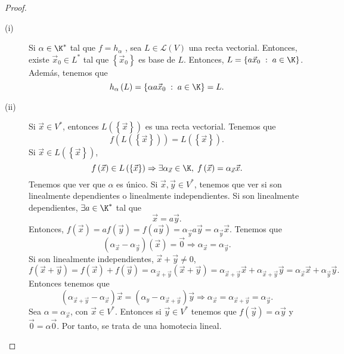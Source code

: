 \begin{proof}
\begin{description}
	\item[(i)] Si $\displaystyle \alpha \in \K^{*} $ tal que $\displaystyle f = h_{\alpha} $ , sea $\displaystyle L \in \mathcal{L}\left(V\right) $ una recta vectorial. Entonces, existe $\displaystyle \vec{x}_{0} \in L^{*}$ tal que $\displaystyle \left\{ \vec{x}_{0}\right\}  $ es base de $\displaystyle L $. Entonces, $\displaystyle L = \left\{ a\vec{x}_{0} \; : \; a \in \K\right\}  $. Además, tenemos que 
		\[h_{\alpha }\left(L\right) = \left\{ \alpha a \vec{x}_{0}\; : \; a \in \K \right\} = L .\]
	\item[(ii)] Si $\displaystyle  \vec{x} \in V^{*} $, entonces $\displaystyle L\left( \left\{ \vec{x}\right\} \right)  $ es una recta vectorial. Tenemos que
		\[f\left(L\left( \left\{ \vec{x}\right\} \right)\right) = L\left( \left\{ \vec{x}\right\} \right) .\]
		Si $\displaystyle \vec{x} \in L\left( \left\{ \vec{x}\right\} \right) $, 
		\[f\left(\vec{x}\right) \in L\left( \left\{ \vec{x}\right\} \right) \Rightarrow \exists \alpha_{\vec{x}} \in \K, \; f\left(\vec{x}\right) = \alpha_{\vec{x}}\vec{x} .\]
Tenemos que ver que $\displaystyle \alpha  $ es único. Si $\displaystyle \vec{x}, \vec{y} \in V^{*} $, tenemos que ver si son linealmente dependientes o linealmente independientes. Si son linealmente dependientes, $\displaystyle \exists a \in \K^{*} $ tal que 
\[\vec{x} = a \vec{y} .\]
Entonces, $\displaystyle f\left(\vec{x}\right) = a f\left(\vec{y}\right) = f\left(a\vec{y}\right) = \alpha_{\vec{y}} a \vec{y} = \alpha_{\vec{y}}\vec{x} $. Tenemos que
\[\left(\alpha_{\vec{x}}-\alpha_{\vec{y}}\right)\left(\vec{x}\right) = \vec{0} \Rightarrow \alpha_{\vec{x}}= \alpha_{\vec{y}} .\]
Si son linealmente independientes, $\displaystyle \vec{x} + \vec{y} \neq 0 $, 
\[f\left(\vec{x}+ \vec{y}\right) = f\left(\vec{x}\right) + f\left(\vec{y}\right) = \alpha_{\vec{x}+\vec{y}}\left(\vec{x}+\vec{y}\right) = \alpha_{\vec{x}+\vec{y}}\vec{x} + \alpha_{\vec{x}+\vec{y}}\vec{y} = \alpha_{\vec{x}}\vec{x}+\alpha_{\vec{y}}\vec{y} .\]
Entonces tenemos que
\[\left(\alpha_{\vec{x}+\vec{y}}-\alpha_{ \vec{x}}\right)\vec{x} = \left(\alpha_{y}-\alpha_{\vec{x}+\vec{y}}\right) \vec{y} \Rightarrow \alpha_{\vec{x}} = \alpha_{\vec{x}+\vec{y}} = \alpha_{\vec{y}} .\]
Sea $\displaystyle \alpha = \alpha_{\vec{x}} $, con $\displaystyle \vec{x} \in V^{*} $. Entonces si $\displaystyle \vec{y} \in V^{*} $ tenemos que $\displaystyle f\left(\vec{y}\right) = \alpha\vec{y} $ y $\displaystyle \vec{0} = \alpha \vec{0} $. Por tanto, se trata de una homotecia lineal.
\end{description}
\end{proof}

